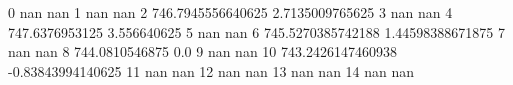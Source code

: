 0 nan nan
1 nan nan
2 746.7945556640625 2.7135009765625
3 nan nan
4 747.6376953125 3.556640625
5 nan nan
6 745.5270385742188 1.44598388671875
7 nan nan
8 744.0810546875 0.0
9 nan nan
10 743.2426147460938 -0.83843994140625
11 nan nan
12 nan nan
13 nan nan
14 nan nan
